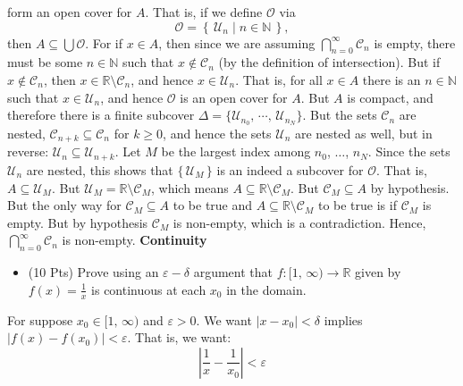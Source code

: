 \documentclass{article}
\begin{document}
    form an open cover for $A$. That is, if we define $\mathcal{O}$ via
    \begin{equation}
        \mathcal{O}
        =
        \left\{\,
            \mathcal{U}_{n}\;|\;n\in\mathbb{N}\,
        \right\},
    \end{equation}
    then $A\subseteq\bigcup\mathcal{O}$. For if $x\in{A}$, then
    since we are assuming $\bigcap_{n=0}^{\infty}\mathcal{C}_{n}$ is empty,
    there must be some $n\in\mathbb{N}$ such that $x\not\in\mathcal{C}_{n}$
    (by the definition of intersection). But if $x\not\in\mathcal{C}_{n}$,
    then $x\in\mathbb{R}\setminus\mathcal{C}_{n}$, and hence
    $x\in\mathcal{U}_{n}$. That is, for all $x\in{A}$ there is an
    $n\in\mathbb{N}$ such that $x\in\mathcal{U}_{n}$, and hence
    $\mathcal{O}$ is an open cover for $A$. But $A$ is compact, and therefore
    there is a finite subcover
    $\Delta=\{\mathcal{U}_{n_{0}},\,\cdots,\,\mathcal{U}_{n_{N}}\}$.
    But the sets $\mathcal{C}_{n}$ are nested,
    $\mathcal{C}_{n+k}\subseteq\mathcal{C}_{n}$ for $k\geq{0}$, and hence
    the sets $\mathcal{U}_{n}$ are nested as well, but in reverse:
    $\mathcal{U}_{n}\subseteq\mathcal{U}_{n+k}$. Let $M$ be the largest index
    among $n_{0}$, $\dots$, $n_{N}$. Since the sets $\mathcal{U}_{n}$ are
    nested, this shows that $\{\,\mathcal{U}_{M}\,\}$ is an indeed a subcover
    for $\mathcal{O}$. That is, $A\subseteq\mathcal{U}_{M}$. But
    $\mathcal{U}_{M}=\mathbb{R}\setminus\mathcal{C}_{M}$, which means
    $A\subseteq\mathbb{R}\setminus\mathcal{C}_{M}$. But
    $\mathcal{C}_{M}\subseteq{A}$ by hypothesis. But the only way for
    $\mathcal{C}_{M}\subseteq{A}$ to be true and
    $A\subseteq\mathbb{R}\setminus\mathcal{C}_{M}$ to be true is if
    $\mathcal{C}_{M}$ is empty. But by hypothesis $\mathcal{C}_{M}$ is
    non-empty, which is a contradiction. Hence,
    $\bigcap_{n=0}^{\infty}\mathcal{C}_{n}$ is non-empty.
    \color{black}
    \newpage
    \textbf{Continuity}
    \begin{itemize}
        \item (10 Pts)
            Prove using an $\varepsilon-\delta$ argument that
            $f:[1,\,\infty)\rightarrow\mathbb{R}$ given by
            $f(x)=\frac{1}{x}$ is continuous at each $x_{0}$ in the domain.
    \end{itemize}
    \color{blue}
    For suppose $x_{0}\in[1,\,\infty)$ and $\varepsilon>0$.
    We want $|x-x_{0}|<\delta$ implies
    $|f(x)-f(x_{0})|<\varepsilon$. That is, we want:
    \begin{equation}
        \left|
            \frac{1}{x}-\frac{1}{x_{0}}
        \right|
        <
        \varepsilon
    \end{equation}
\end{document}
